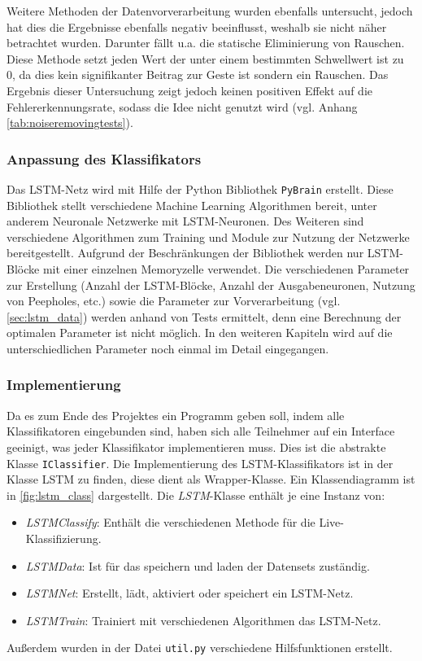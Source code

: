 Weitere Methoden der Datenvorverarbeitung wurden ebenfalls untersucht, jedoch
hat dies die Ergebnisse ebenfalls negativ beeinflusst, weshalb sie nicht näher
betrachtet wurden. Darunter fällt u.a. die statische Eliminierung von Rauschen.
Diese Methode setzt jeden Wert der unter einem bestimmten Schwellwert ist zu 0,
da dies kein signifikanter Beitrag zur Geste ist sondern ein Rauschen. Das
Ergebnis dieser Untersuchung zeigt jedoch keinen positiven Effekt auf die Fehlererkennungsrate, sodass die Idee nicht
genutzt wird (vgl. Anhang \autoref{tab:noiseremovingtests}).

\subsubsection{Anpassung des Klassifikators}
Das \ac{LSTM}-Netz wird mit Hilfe der Python Bibliothek \texttt{PyBrain}
\cite{schaul2010} erstellt. Diese Bibliothek stellt verschiedene Machine
Learning Algorithmen bereit, unter anderem Neuronale Netzwerke mit
\ac{LSTM}-Neuronen. Des Weiteren sind verschiedene Algorithmen zum Training und
Module zur Nutzung der Netzwerke bereitgestellt. Aufgrund der Beschränkungen der
Bibliothek werden nur \ac{LSTM}-Blöcke mit einer einzelnen Memoryzelle
verwendet. Die verschiedenen Parameter zur Erstellung (Anzahl der
\ac{LSTM}-Blöcke, Anzahl der Ausgabeneuronen, Nutzung von Peepholes, etc.) sowie
die Parameter zur Vorverarbeitung (vgl. \autoref{sec:lstm_data}) werden anhand
von Tests ermittelt, denn eine Berechnung der optimalen Parameter ist nicht
möglich. In den weiteren Kapiteln wird auf die unterschiedlichen Parameter noch
einmal im Detail eingegangen. 
  

\subsubsection{Implementierung}
Da es zum Ende des Projektes ein Programm geben soll, indem alle Klassifikatoren
eingebunden sind, haben sich alle Teilnehmer auf ein Interface geeinigt, was
jeder Klassifikator implementieren muss. Dies ist die abstrakte Klasse
\texttt{IClassifier}. Die Implementierung des \ac{LSTM}-Klassifikators ist in
der Klasse LSTM zu finden, diese dient als Wrapper-Klasse. Ein Klassendiagramm
ist in \autoref{fig:lstm_class} dargestellt. Die \textit{LSTM}-Klasse enthält je eine Instanz von: 
\begin{itemize}
\item \textit{LSTMClassify}: Enthält die verschiedenen Methode für die Live-Klassifizierung.
\item \textit{LSTMData}: Ist für das speichern und laden der Datensets zuständig.
\item \textit{LSTMNet}: Erstellt, lädt, aktiviert oder speichert ein LSTM-Netz.
\item \textit{LSTMTrain}: Trainiert mit verschiedenen Algorithmen das LSTM-Netz.
\end{itemize}
Außerdem wurden in der Datei \texttt{util.py} verschiedene Hilfsfunktionen
erstellt.

